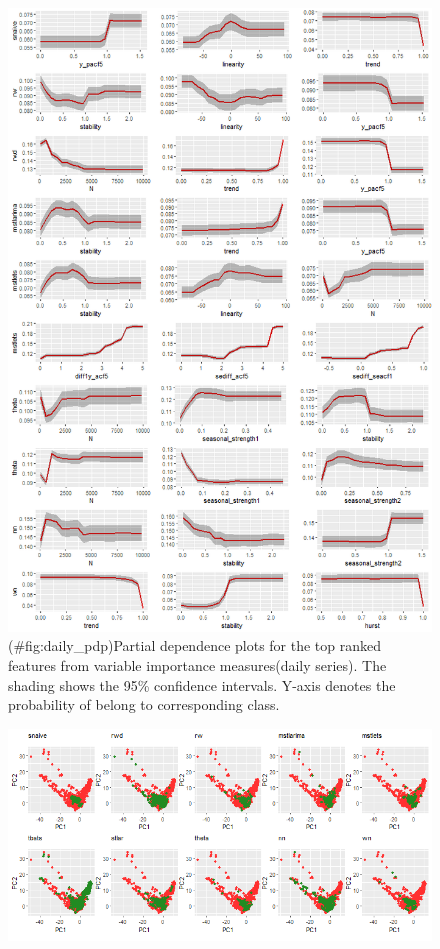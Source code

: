 \documentclass[11pt,a4paper,]{article}
\theoremstyle{definition}
\theoremstyle{definition}
\theoremstyle{definition}
\theoremstyle{remark}
\begin{document}
\newpage

\begin{figure}
\centering
\includegraphics{figures/daily_pdp-1.png}
\caption{(\#fig:daily\_pdp)Partial dependence plots for the top ranked
features from variable importance measures(daily series). The shading
shows the 95\% confidence intervals. Y-axis denotes the probability of
belong to corresponding class.}
\end{figure}

\newpage

\begin{figure}[h]

{\centering \includegraphics{figures/pca_daily-1} 

}

\end{figure}
\end{document}
